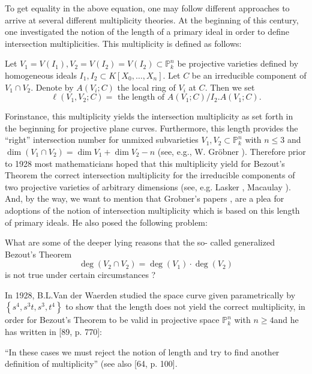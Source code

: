 To get equality in the above equation, one may follow different
approaches to arrive at several different multiplicity theories. At
the beginning of this century, one investigated the notion of the
length of a primary ideal in order to define intersection
multiplicities. This multiplicity is defined as follows: 

Let  $V_1 = V(I_1), V_2 = V(I_2) = V(I_2) \subset \mathbb{P}^n_k $ be
projective varieties defined by homogeneous ideals $I_1, I_2 \subset K
[X_0, \ldots,  X_n]$. Let $C$ be an irreducible component of $V_1 \cap
V_2$. Denote by $A(V_i;C)$ the local ring of $V_i$ at $C$. Then we set 
 $$
 \ell(V_1, V_2 ; C) = \text{ the length of } A(V_1 ; C) /I_2.  A(V_1 ; C).
 $$
 
 For\pageoriginale instance, this multiplicity yields the intersection multiplicity
 as set forth in the beginning for projective plane curves. Furthermore,
 this length provides the ``right'' intersection number for unmixed
 subvarieties $V_1, V_2 \subset \mathbb{P}^n_k$ with $n \le 3$ and
 $\dim (V_1 \cap V_2) = \dim V_1 + \dim V_2 - n$ (see, e.g.,
 W. Gr\"obner \cite{26}). Therefore prior to 1928 most mathematicians
 hoped that this multiplicity yield for Bezout's Theorem the correct
 intersection multiplicity for the irreducible components of two
 projective varieties of arbitrary dimensions (see, e.g. Lasker
 \cite{44}, Macaulay \cite{49}). And, by the way, we want to mention that
 Grobner's papers \cite{26}, \cite{29} are a plea for adoptions of the notion
 of intersection multiplicity which is based on this length of primary
 ideals. He also posed the following problem: 

\setcounter{problem}{3}
\begin{problem}\label{chap0:sec1:prob0.4}
  What are some of the deeper lying reasons that the so-
  called generalized Bezout's Theorem 
  $$
  \deg (V_2 \cap V_2) = \deg (V_1) \cdot \deg (V_2)
  $$
  is not true under certain circumstances ?
\end{problem}

In 1928, B.L.Van der Waerden \cite{90} studied the space curve given
parametrically by $\left\{ s^4, s^3 t, s^3, t^4 \right\}$ to show that
the length 
does not yield the correct multiplicity, in order for Bezout's Theorem
to be valid in projective space $\mathbb{P}^n_k$ with $n \ge
4$\pageoriginale and he has written in [89, p. 770]: 

``In these cases we must reject the notion of length and try to find 
another definition of multiplicity'' (see also [64, p. 100].  

